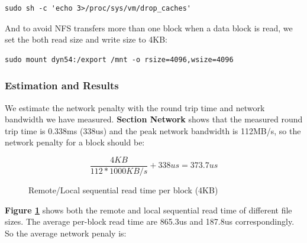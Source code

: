 \begin{lstlisting}
sudo sh -c 'echo 3>/proc/sys/vm/drop_caches'
\end{lstlisting}

And to avoid NFS transfers more than one block when a data block is read, we set the both read size and write size to 4KB:

\begin{lstlisting}
sudo mount dyn54:/export /mnt -o rsize=4096,wsize=4096
\end{lstlisting}


\subsubsection{Estimation and Results}
We estimate the network penalty with the round trip time and network bandwidth we have measured. \textbf{Section Network} shows that the measured round trip time is 0.338ms (338us) and the peak network bandwidth is 112MB/s, so the network penalty for a block should be:

$$\frac{4KB}{112*1000KB/s} + 338us = 373.7us$$

\begin{figure}[ht]
    \centering
    \caption{Remote/Local sequential read time per block (4KB)}
    \label{rseq_read_time}
\end{figure}

\textbf{Figure \ref{rseq_read_time}} shows both the remote and local sequential read time of different file sizes. The average per-block read time are 865.3us and 187.8us correspondingly. So the average network penaly is:

